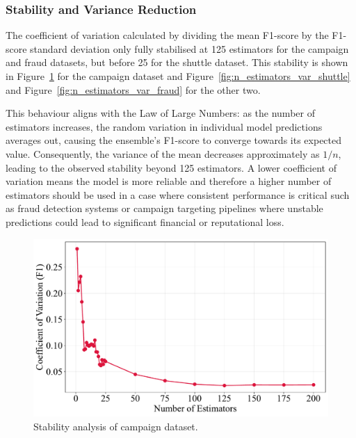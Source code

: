 \documentclass[10pt, conference]{IEEEtran}
\begin{document}



\subsubsection{Stability and Variance Reduction}
The coefficient of variation calculated by dividing the mean F1-score by the F1-score standard deviation only fully stabilised at 125 estimators for the campaign and fraud datasets, but before 25 for the shuttle dataset. This stability is shown in Figure~\ref{fig:n_estimators_var} for the campaign dataset and Figure~\ref{fig:n_estimators_var_shuttle} and Figure~\ref{fig:n_estimators_var_fraud} for the other two. 

This behaviour aligns with the Law of Large Numbers: as the number of estimators increases, the random variation in individual model predictions averages out, causing the ensemble’s F1-score to converge towards its expected value. Consequently, the variance of the mean decreases approximately as 
$1/n$, leading to the observed stability beyond 125 estimators. A lower coefficient of variation means the model is more reliable and therefore a higher number of estimators should be used in a case where consistent performance is critical such as fraud detection systems or campaign targeting pipelines where unstable predictions could lead to significant financial or reputational loss.

\begin{figure}[H]
	\centering
	\includegraphics[width=0.95\linewidth]{../results/campaign/n_estimators/stability_analysis.pdf}
	\caption{Stability analysis of campaign dataset.}
	\label{fig:n_estimators_var}
\end{figure}
\end{document}
